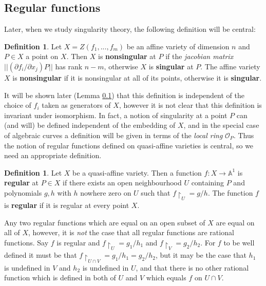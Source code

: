 \documentclass[12pt]{article}
\theoremstyle{plain}
\theoremstyle{definition}
\newtheorem{defn}[thm]{Definition} %
\newcommand{\bb}[1]{\mathbb{#1}}
\newcommand{\call}[1]{\mathcal{#1}}
\newcommand{\lto}{\longrightarrow}
\begin{document}
\subsection{Regular functions}
Later, when we study singularity theory, the following definition will be central:
\begin{defn}
Let $X = Z(f_1,...,f_m)$ be an affine variety of dimension $n$ and $P \in X$ a point on $X$. Then $X$ is \textbf{nonsingular} at $P$ if the \emph{jacobian matrix} $||(\partial f_i/\partial x_j)P ||$ has rank $n - m$, otherwise $X$ is \textbf{singular} at $P$. The affine variety $X$ is \textbf{nonsingular} if it is nonsingular at all of its points, otherwise it is \textbf{singular}.
\end{defn}
It will be shown later (Lemma \ref{}) that this definition is independent of the choice of $f_i$ taken as generators of $X$, however it is not clear that this definition is invariant under isomorphism. In fact, a notion of singularity at a point $P$ can (and will) be defined independent of the embedding of $X$, and in the special case of algebraic curves a definition will be given in terms of the \emph{local ring} $\call{O}_P$. Thus the notion of regular functions defined on quasi-affine varieties is central, so we need an appropriate definition.
\begin{defn}
Let $X$ be a quasi-affine variety. Then a function $f: X \lto \bb{A}^1$ is \textbf{regular} at $P \in X$ if there exists an open neighbourhood $U$ containing $P$ and polynomials $g,h$ with $h$ nowhere zero on $U$ such that $f\restriction_U = g/h$. The function $f$ is \textbf{regular} if it is regular at every point $X$.
\end{defn}
Any two regular functions which are equal on an open subset of $X$ are equal on all of $X$, however, it is \emph{not} the case that all regular functions are rational functions. Say $f$ is regular and $f\restriction_U = g_1/h_1$ and $f\restriction_V = g_2/h_2$. For $f$ to be well defined it must be that $f\restriction_{U \cap V} = g_1/h_1 = g_2/h_2$, but it may be the case that $h_1$ is undefined in $V$ and $h_2$ is undefined in $U$, and that there is no other rational function which is defined in both of $U$ and $V$ which equals $f$ on $U \cap V$.
\end{document}

